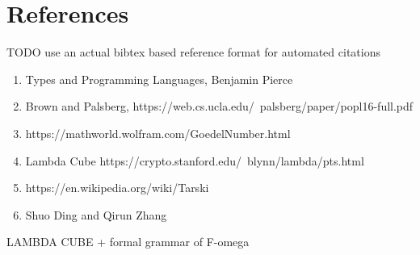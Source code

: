 \documentclass{article}
\begin{document}
\section{References}

TODO use an actual bibtex based reference format for automated citations
\begin{enumerate}
    \item Types and Programming Languages, Benjamin Pierce
    \item Brown and Palsberg, https://web.cs.ucla.edu/~palsberg/paper/popl16-full.pdf
    \item https://mathworld.wolfram.com/GoedelNumber.html
    \item Lambda Cube https://crypto.stanford.edu/~blynn/lambda/pts.html
    \item https://en.wikipedia.org/wiki/Tarski%
    \item Shuo Ding and Qirun Zhang
\end{enumerate}

\appendixpage
LAMBDA CUBE + formal grammar of F-omega
\end{document}
